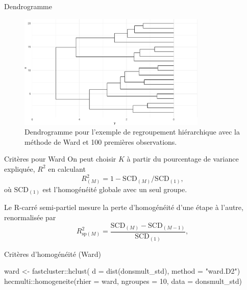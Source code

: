 \documentclass[
  ignorenonframetext,
]{beamer}
\newenvironment{Shaded}{\begin{snugshade}}{\end{snugshade}}
\newcommand{\AttributeTok}[1]{\textcolor[rgb]{0.40,0.45,0.13}{#1}}
\newcommand{\DecValTok}[1]{\textcolor[rgb]{0.68,0.00,0.00}{#1}}
\newcommand{\FunctionTok}[1]{\textcolor[rgb]{0.28,0.35,0.67}{#1}}
\newcommand{\NormalTok}[1]{\textcolor[rgb]{0.00,0.23,0.31}{#1}}
\newcommand{\OtherTok}[1]{\textcolor[rgb]{0.00,0.23,0.31}{#1}}
\newcommand{\SpecialCharTok}[1]{\textcolor[rgb]{0.37,0.37,0.37}{#1}}
\newcommand{\StringTok}[1]{\textcolor[rgb]{0.13,0.47,0.30}{#1}}
\begin{document}
\begin{frame}{Dendrogramme}
\protect\hypertarget{dendrogramme}{}
\begin{figure}

{\centering \includegraphics[width=0.8\textwidth,height=\textheight]{MATH60602-diapos12_files/figure-beamer/fig-dendrogramme-1.pdf}

}

\caption{\label{fig-dendrogramme}Dendrogramme pour l'exemple de
regroupement hiérarchique avec la méthode de Ward et 100 premières
observations.}

\end{figure}
\end{frame}

\begin{frame}{Critères pour Ward}
\protect\hypertarget{crituxe8res-pour-ward}{}
On peut choisir \(K\) à partir du pourcentage de variance expliquée,
\(R^2\) en calculant
\[R^2_{(M)} = 1-\mathrm{SCD}_{(M)}/\mathrm{SCD}_{(1)},\] où
\(\mathrm{SCD}_{(1)}\) est l'homogénéité globale avec un seul groupe.

Le R-carré semi-partiel mesure la perte d'homogénéité d'une étape à
l'autre, renormalisée par
\[R^2_{\text{sp}(M)} =\frac{\mathrm{SCD}_{(M)} - \mathrm{SCD}_{(M-1)}}{\mathrm{SCD}_{(1)}},\]
\end{frame}

\begin{frame}[fragile]{Critères d'homogénéité (Ward)}
\protect\hypertarget{crituxe8res-dhomoguxe9nuxe9ituxe9-ward}{}
\begin{Shaded}
\begin{Highlighting}[numbers=left,,]
\NormalTok{ward }\OtherTok{\textless{}{-}}\NormalTok{ fastcluster}\SpecialCharTok{::}\FunctionTok{hclust}\NormalTok{(}
  \AttributeTok{d =} \FunctionTok{dist}\NormalTok{(donsmult\_std),}
  \AttributeTok{method =} \StringTok{"ward.D2"}\NormalTok{)}
\NormalTok{hecmulti}\SpecialCharTok{::}\FunctionTok{homogeneite}\NormalTok{(}\AttributeTok{rhier =}\NormalTok{ ward, }
                      \AttributeTok{ngroupes =} \DecValTok{10}\NormalTok{,}
                      \AttributeTok{data =}\NormalTok{ donsmult\_std)}
\end{Highlighting}
\end{Shaded}
\end{frame}
\end{document}
